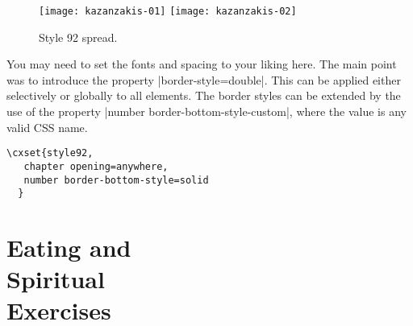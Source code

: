 \begin{figure}[ht]
\centering
\texttt{[image: kazanzakis-01]}
\texttt{[image: kazanzakis-02]}
\caption{Style 92 spread.}
\end{figure}

You may need to set the fonts and spacing to your liking here. The main point was to introduce the property
|border-style=double|. This can be applied either selectively or globally to all elements. The border styles can be extended by the use of the property |number border-bottom-style-custom|, where the value is 
any valid CSS name. 


\example
\begin{verbatim}
\cxset{style92,
   chapter opening=anywhere,
   number border-bottom-style=solid
  }
\end{verbatim}


          
 \chapter[Template 92]{Eating and\\[10pt] Spiritual\\[10pt] Exercises}         
          
